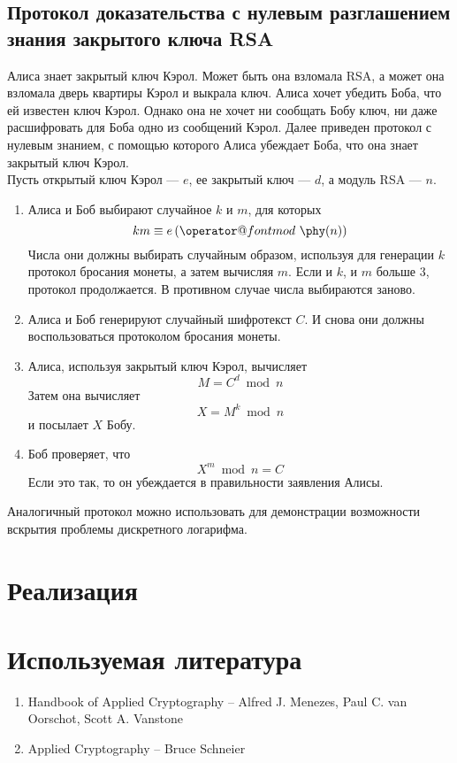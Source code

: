 \documentclass[12pt,a4paper]{report}
\makeatletter
\def\imod#1{\allowbreak\,({\operator@font mod}\ #1)}
\makeatother
\begin{document}
\section{Протокол доказательства с
нулевым разглашением знания закрытого ключа RSA}

Алиса знает закрытый ключ Кэрол. Может быть она взломала RSA, а
может она взломала дверь квартиры Кэрол и выкрала ключ. Алиса
хочет убедить Боба, что ей известен ключ Кэрол. Однако она не
хочет ни сообщать Бобу ключ, ни даже расшифровать для Боба одно
из сообщений Кэрол. Далее приведен протокол с нулевым знанием,
с помощью которого Алиса убеждает Боба, что она знает закрытый
ключ Кэрол.\\

Пусть открытый ключ Кэрол --- $e$, ее закрытый ключ --- $d$, а
модуль RSA --- $n$.

\begin{enumerate}
\item Алиса и Боб выбирают случайное $k$ и $m$, 
для которых $$km \equiv e \imod{\phy(n)}$$ Числа они 
должны выбирать случайным образом, используя для
генерации $k$ протокол бросания монеты, а затем 
вычисляя $m$. Если и $k$, и $m$ больше $3$,
протокол продолжается. В противном случае числа
выбираются заново.
\item Алиса и Боб генерируют случайный шифротекст
$C$. И снова они должны воспользоваться протоколом
бросания монеты.
\item Алиса, используя закрытый ключ Кэрол, вычисляет
$$M = C^d\bmod{n}$$ Затем она вычисляет 
$$ X = M^k\bmod{n}$$ и посылает $X$ Бобу.
\item Боб проверяет, что $$X^m\bmod{n} = C$$
Если это так, то он убеждается в правильности 
заявления Алисы.
\end{enumerate}

Аналогичный протокол можно использовать для демонстрации
возможности вскрытия проблемы дискретного логарифма.


\chapter{Реализация}


\chapter*{Используемая литература}

\begin{enumerate}
\item Handbook of Applied Cryptography -- Alfred J. Menezes, Paul C. van Oorschot, Scott A. Vanstone
\item Applied Cryptography -- Bruce Schneier
\end{enumerate}
\end{document}
